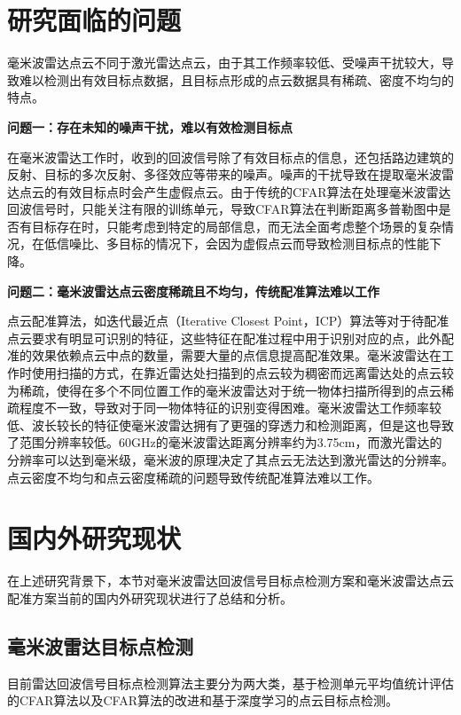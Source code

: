 \section{研究面临的问题}
毫米波雷达点云不同于激光雷达点云，由于其工作频率较低、受噪声干扰较大，导致难以检测出有效目标点数据，且目标点形成的点云数据具有稀疏、密度不均匀的特点。

\textbf{问题一：存在未知的噪声干扰，难以有效检测目标点}
\par
在毫米波雷达工作时，收到的回波信号除了有效目标点的信息，还包括路边建筑的反射、目标的多次反射、多径效应等带来的噪声\cite{richards2010principles}。噪声的干扰导致在提取毫米波雷达点云的有效目标点时会产生虚假点云。由于传统的CFAR算法在处理毫米波雷达回波信号时，只能关注有限的训练单元，导致CFAR算法在判断距离多普勒图中是否有目标存在时，只能考虑到特定的局部信息，而无法全面考虑整个场景的复杂情况，在低信噪比、多目标的情况下，会因为虚假点云而导致检测目标点的性能下降。
\par
\textbf{问题二：毫米波雷达点云密度稀疏且不均匀，传统配准算法难以工作}
\par
点云配准算法，如迭代最近点（Iterative Closest Point，ICP）算法\cite{besl1992method}等对于待配准点云要求有明显可识别的特征，这些特征在配准过程中用于识别对应的点，此外配准的效果依赖点云中点的数量，需要大量的点信息提高配准效果。毫米波雷达在工作时使用扫描的方式，在靠近雷达处扫描到的点云较为稠密而远离雷达处的点云较为稀疏，使得在多个不同位置工作的毫米波雷达对于统一物体扫描所得到的点云稀疏程度不一致，导致对于同一物体特征的识别变得困难。毫米波雷达工作频率较低、波长较长的特征使毫米波雷达拥有了更强的穿透力和检测距离，但是这也导致了范围分辨率较低。60GHz的毫米波雷达距离分辨率约为3.75cm\cite{meta2007signal}，而激光雷达的分辨率可以达到毫米级，毫米波的原理决定了其点云无法达到激光雷达的分辨率。点云密度不均匀和点云密度稀疏的问题导致传统配准算法难以工作。
\section{国内外研究现状}
在上述研究背景下，本节对毫米波雷达回波信号目标点检测方案和毫米波雷达点云配准方案当前的国内外研究现状进行了总结和分析。
\subsection{毫米波雷达目标点检测}
目前雷达回波信号目标点检测算法主要分为两大类，基于检测单元平均值统计评估的CFAR算法以及CFAR算法的改进和基于深度学习的点云目标点检测。

